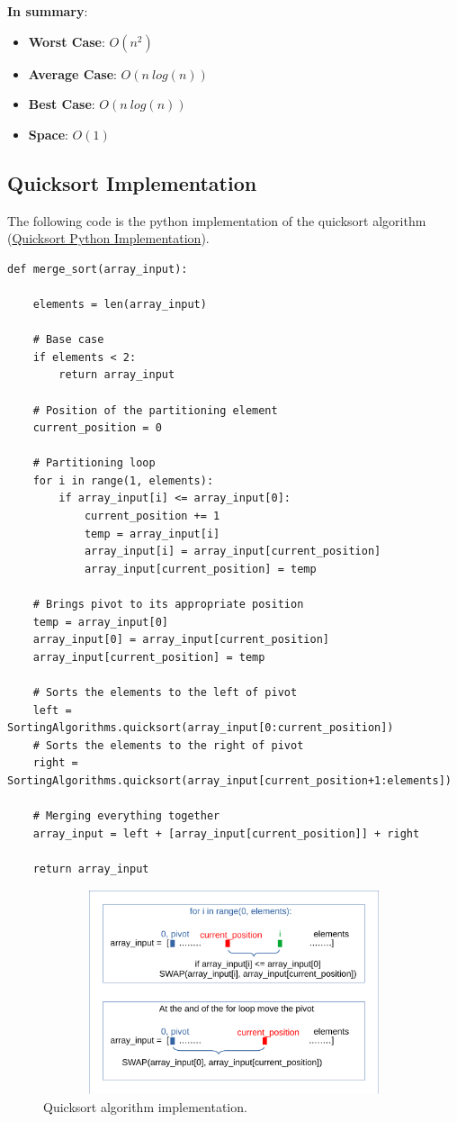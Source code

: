 \textbf{In summary}:
\begin{itemize}
\item \textbf{Worst Case}: \(O(n^{2})\)
\item \textbf{Average Case}: \(O(n\ log(n))\)
\item \textbf{Best Case}: \(O(n\ log(n))\)
\item \textbf{Space}: \(O(1)\)
\end{itemize}

\subsection{Quicksort Implementation}
The following code is the python implementation of the quicksort algorithm \cite{quicksortcode} (\href{https://www.educative.io/edpresso/how-to-implement-quicksort-in-python}{Quicksort Python Implementation}).
\begin{lstlisting}[caption={Quicksort python implementation.}]
def merge_sort(array_input):
	
	elements = len(array_input)
        
    # Base case
    if elements < 2:
    	return array_input
        
    # Position of the partitioning element
    current_position = 0

	# Partitioning loop
	for i in range(1, elements):
    	if array_input[i] <= array_input[0]:
        	current_position += 1
            temp = array_input[i]
            array_input[i] = array_input[current_position]
            array_input[current_position] = temp

    # Brings pivot to its appropriate position
    temp = array_input[0]
    array_input[0] = array_input[current_position]
    array_input[current_position] = temp
        
    # Sorts the elements to the left of pivot
    left = SortingAlgorithms.quicksort(array_input[0:current_position])
    # Sorts the elements to the right of pivot
    right = SortingAlgorithms.quicksort(array_input[current_position+1:elements])

    # Merging everything together
    array_input = left + [array_input[current_position]] + right

	return array_input
\end{lstlisting}

\begin{figure}[hb]
	\includegraphics[width=14cm,height=6cm]{chapters/searchandsorting/images/sorting_12.pdf}
	\caption[]{Quicksort algorithm implementation.}
	\label{sorting_12}
\end{figure}